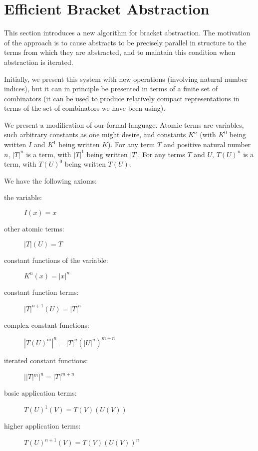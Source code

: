 \documentclass{article}
\begin{document}
\section{Efficient Bracket Abstraction}

This section introduces a new algorithm for bracket abstraction.  The
motivation of the approach is to cause abstracts to be precisely parallel
in structure to the terms from which they are abstracted, and to maintain
this condition when abstraction is iterated.

Initially, we present this system with new operations (involving
natural number indices), but it can in principle be presented in terms
of a finite set of combinators (it can be used to produce relatively
compact representations in terms of the set of combinators we have
been using).

We present a modification of our formal language.  Atomic terms are
variables, such arbitrary constants as one might desire, and constants
$K^n$ (with $K^0$ being written $I$ and $K^1$ being written $K$).  For
any term $T$ and positive natural number $n$, $|T|^n$ is a term, with
$|T|^1$ being written $|T|$.  For any terms $T$ and $U$, $T(U)^n$ is a
term, with $T(U)^0$ being written $T(U)$.

We have the following axioms:

\begin{description}

\item[the variable:] $I(x)=x$

\item[other atomic terms:]  $|T|(U) = T$

\item[constant functions of the variable:]  $K^n(x)=|x|^n$

\item[constant function terms:]  $|T|^{n+1}(U) = |T|^n$

\item[complex constant functions:] $|T(U)^m|^n = |T|^n(|U|^n)^{m+n}$

\item[iterated constant functions:] $||T|^m|^n = |T|^{m+n}$

\item[basic application terms:]  $T(U)^1(V) = T(V)(U(V))$

\item[higher application terms:] $T(U)^{n+1}(V) = T(V)(U(V))^n$

\end{description}
\end{document}
